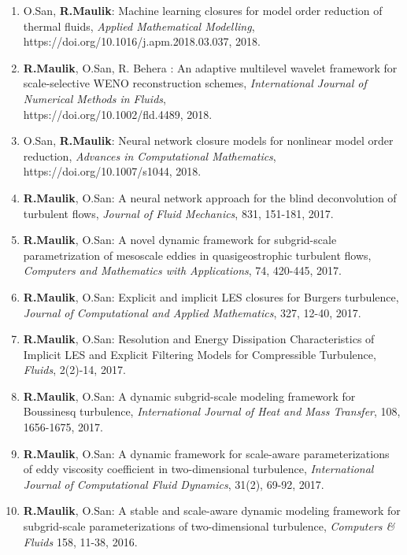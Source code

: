 \documentclass[letterpaper]{article}
\begin{document}
\begin{enumerate}
\item O.San, \textbf{R.Maulik}: Machine learning closures for model order reduction of thermal fluids,  {\it Applied Mathematical Modelling}, https://doi.org/10.1016/j.apm.2018.03.037, 2018.

\item \textbf{R.Maulik}, O.San, R. Behera : An adaptive multilevel wavelet framework for scale-selective WENO reconstruction schemes, {\it International Journal of Numerical Methods in Fluids},\\ https://doi.org/10.1002/fld.4489, 2018.

\item O.San, \textbf{R.Maulik}: Neural network closure models for nonlinear model order reduction, {\it Advances in Computational Mathematics}, https://doi.org/10.1007/s1044, 2018.

\item \textbf{R.Maulik}, O.San: A neural network approach for the blind deconvolution of turbulent flows, {\it Journal of Fluid Mechanics}, 831, 151-181, 2017.

\item \textbf{R.Maulik}, O.San: A novel dynamic framework for subgrid-scale parametrization of mesoscale eddies in quasigeostrophic turbulent flows, {\it Computers and Mathematics with Applications}, 74, 420-445, 2017.

\item \textbf{R.Maulik}, O.San: Explicit and implicit LES closures for Burgers turbulence, {\it Journal of Computational and Applied Mathematics}, 327, 12-40, 2017.

\item \textbf{R.Maulik}, O.San: Resolution and Energy Dissipation Characteristics of Implicit LES and Explicit Filtering Models for Compressible Turbulence, {\it Fluids}, 2(2)-14, 2017.

\item \textbf{R.Maulik}, O.San: A dynamic subgrid-scale modeling framework for Boussinesq turbulence, {\it International Journal of Heat and Mass Transfer}, 108, 1656-1675, 2017.

\item \textbf{R.Maulik}, O.San: A dynamic framework for scale-aware parameterizations of eddy viscosity coefficient in two-dimensional turbulence, {\it International Journal of Computational Fluid Dynamics}, 31(2), 69-92, 2017.

\item \textbf{R.Maulik}, O.San: A stable and scale-aware dynamic modeling framework for subgrid-scale parameterizations of two-dimensional turbulence, {\it Computers \& Fluids} 158, 11-38, 2016.


\end{enumerate}
\end{document}
